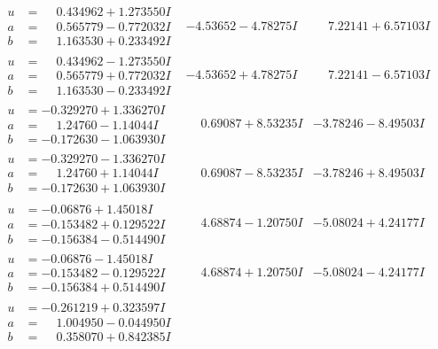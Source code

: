 \documentclass[1p]{elsarticle_modified}
\theoremstyle{definition}
\begin{document}
$$\begin{array}{c|c|c}
\begin{aligned}
u &= \phantom{-}0.434962 + 1.273550 I \\
a &= \phantom{-}0.565779 - 0.772032 I \\
b &= \phantom{-}1.163530 + 0.233492 I\end{aligned}
 & -4.53652 - 4.78275 I & \phantom{-}7.22141 + 6.57103 I \\ \hline\begin{aligned}
u &= \phantom{-}0.434962 - 1.273550 I \\
a &= \phantom{-}0.565779 + 0.772032 I \\
b &= \phantom{-}1.163530 - 0.233492 I\end{aligned}
 & -4.53652 + 4.78275 I & \phantom{-}7.22141 - 6.57103 I \\ \hline\begin{aligned}
u &= -0.329270 + 1.336270 I \\
a &= \phantom{-}1.24760 - 1.14044 I \\
b &= -0.172630 - 1.063930 I\end{aligned}
 & \phantom{-}0.69087 + 8.53235 I & -3.78246 - 8.49503 I \\ \hline\begin{aligned}
u &= -0.329270 - 1.336270 I \\
a &= \phantom{-}1.24760 + 1.14044 I \\
b &= -0.172630 + 1.063930 I\end{aligned}
 & \phantom{-}0.69087 - 8.53235 I & -3.78246 + 8.49503 I \\ \hline\begin{aligned}
u &= -0.06876 + 1.45018 I \\
a &= -0.153482 + 0.129522 I \\
b &= -0.156384 - 0.514490 I\end{aligned}
 & \phantom{-}4.68874 - 1.20750 I & -5.08024 + 4.24177 I \\ \hline\begin{aligned}
u &= -0.06876 - 1.45018 I \\
a &= -0.153482 - 0.129522 I \\
b &= -0.156384 + 0.514490 I\end{aligned}
 & \phantom{-}4.68874 + 1.20750 I & -5.08024 - 4.24177 I \\ \hline\begin{aligned}
u &= -0.261219 + 0.323597 I \\
a &= \phantom{-}1.004950 - 0.044950 I \\
b &= \phantom{-}0.358070 + 0.842385 I\end{aligned}

\end{array}$$
\end{document}
